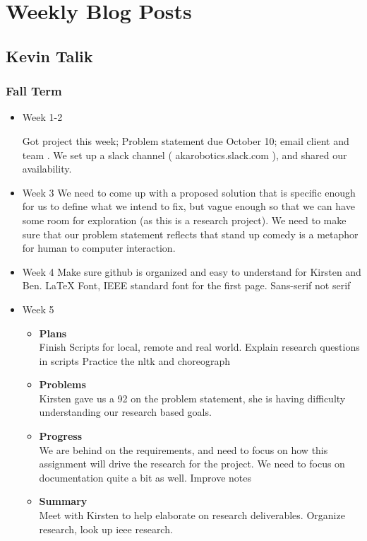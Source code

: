 
\section{Weekly Blog Posts}
	\subsection{Kevin Talik}
	\subsubsection{Fall Term}
	\begin{itemize}
		\item{Week 1-2}

			Got project this week; Problem statement due October 10; email client and team . 
			We set up a slack channel ( akarobotics.slack.com ), and shared our availability. 
		\item{Week 3}
			We need to come up with a proposed solution that is specific enough for us to define what we intend to fix, but vague enough so that we can have some room for exploration (as this is a research project). 
			We need to make sure that our problem statement reflects that stand up comedy is a metaphor for human to computer interaction. 

			 
		\item{Week 4}
		Make sure github is organized and easy to understand for Kirsten and Ben. 
		LaTeX Font, IEEE standard font for the first page. Sans-serif not serif 
		\item{Week 5}
			\begin{itemize}
				\item \textbf{Plans} \\
				Finish Scripts for local, remote and real world. 
				Explain research questions in scripts 
				Practice the nltk and choreograph 
				\item \textbf{Problems} \\
				Kirsten gave us a 92 on the problem statement, she is having difficulty understanding our research based goals. 
				\item \textbf{Progress} \\
				We are behind on the requirements, and need to focus on how this assignment will drive the research for the project.
				We need to focus on documentation quite a bit as well. Improve notes
				\item \textbf{Summary} \\
				Meet with Kirsten to help elaborate on research deliverables.  
				Organize research, look up ieee research. 
			\end{itemize}


\end{itemize}
